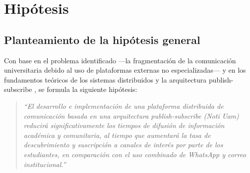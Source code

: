 \section{Hipótesis}

\subsection{Planteamiento de la hipótesis general}

Con base en el problema identificado —la fragmentación de la comunicación universitaria debido al uso de plataformas externas no especializadas— y en los fundamentos teóricos de los sistemas distribuidos y la arquitectura publish-subscribe \cite{tanenbaum2023distributed, tarkoma2012publish}, se formula la siguiente hipótesis:

\begin{quote}
\textit{“El desarrollo e implementación de una plataforma distribuida de comunicación basada en una arquitectura publish-subscribe (Noti Uam) reducirá significativamente los tiempos de difusión de información académica y comunitaria, al tiempo que aumentará la tasa de descubrimiento y suscripción a canales de interés por parte de los estudiantes, en comparación con el uso combinado de WhatsApp y correo institucional.”}
\end{quote}

